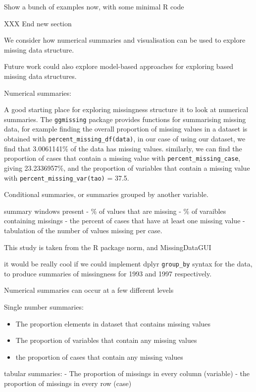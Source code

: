 \documentclass[]{article}
\providecommand{\tightlist}{%
  \setlength{\itemsep}{0pt}\setlength{\parskip}{0pt}}
\begin{document}
Show a bunch of examples now, with some minimal R code

XXX End new section

We consider how numerical summaries and visualisation can be used to
explore missing data structure.

Future work could also explore model-based approaches for exploring
based missing data structures.

Numerical summaries:

A good starting place for exploring missingness structure it to look at
numerical summaries. The \texttt{ggmissing} package provides functions
for summarising missing data, for example finding the overall proportion
of missing values in a dataset is obtained with
\texttt{percent\_missing\_df(data)}, in our case of using our dataset,
we find that 3.0061141\% of the data has missing values. similarly, we
can find the proportion of cases that contain a missing value with
\texttt{percent\_missing\_case}, giving 23.2336957\%, and the proportion
of variables that contain a missing value with
\texttt{percent\_missing\_var(tao)} = 37.5.

Conditional summaries, or summaries grouped by another variable.

summary windows present - \% of values that are missing - \% of
varaibles containing missings - the percent of cases that have at least
one missing value - tabulation of the number of values missing per case.

This study is taken from the R package norm, and MissingDataGUI

it would be really cool if we could implement dplyr \texttt{group\_by}
syntax for the data, to produce summaries of missingness for 1993 and
1997 respectively.

Numerical summaries can occur at a few different levels

Single number summaries:

\begin{itemize}
\tightlist
\item
  The proportion elements in dataset that contains missing values
\item
  The proportion of variables that contain any missing values
\item
  the proportion of cases that contain any missing values
\end{itemize}

tabular summaries: - The proportion of missings in every column
(variable) - the proportion of missings in every row (case)
\end{document}
